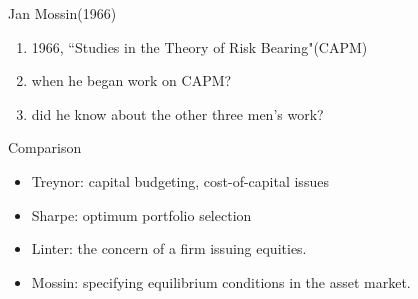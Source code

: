 \documentclass{beamer}
\begin{document}
\begin{frame}{Jan Mossin(1966)}
	\begin{enumerate}[1.]
		\item<2-> 1966, ``Studies in the Theory of Risk Bearing"\alert{(CAPM)}
		\item<3-> when he began work on CAPM?
		\item<4-> did he know about the other three men's work?
	\end{enumerate}
\end{frame}
\begin{frame}{Comparison}
	\begin{itemize}
		\item Treynor: capital budgeting, cost-of-capital issues
		\item Sharpe: optimum portfolio selection
		\item Linter: the concern of a firm issuing equities.
		\item Mossin: specifying equilibrium conditions in the asset market.
	\end{itemize}
\end{frame}
\end{document}
